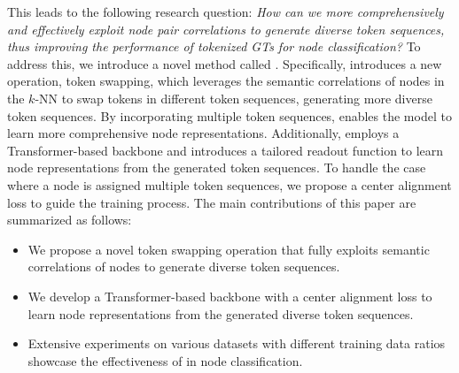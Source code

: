 This leads to the following research question: \textit{How can we more comprehensively and effectively exploit node pair correlations to generate diverse token sequences, thus improving the performance of tokenized GTs for node classification?} 
To address this, we introduce a novel method called \name. 
Specifically, \name introduces a new operation, token swapping, which leverages the  semantic correlations of nodes in the $k$-NN to swap tokens in different token sequences, generating more diverse token sequences.
By incorporating multiple token sequences, \name 
enables the model to learn more comprehensive node representations. 
Additionally, \name employs a Transformer-based backbone and introduces a tailored readout function to learn node representations from the generated token sequences.
To handle the case where a node is assigned multiple token sequences, we propose a center alignment loss to guide the training process. 
The main contributions of this paper are summarized as follows:
\begin{itemize}
    \item We propose a novel token swapping operation that fully exploits semantic correlations of nodes to generate diverse token sequences.
    \item We develop a Transformer-based backbone with a center alignment loss to learn node representations from the generated diverse token sequences.
    \item Extensive experiments on various datasets with different training data ratios showcase the effectiveness of \name in node classification. 
\end{itemize}





